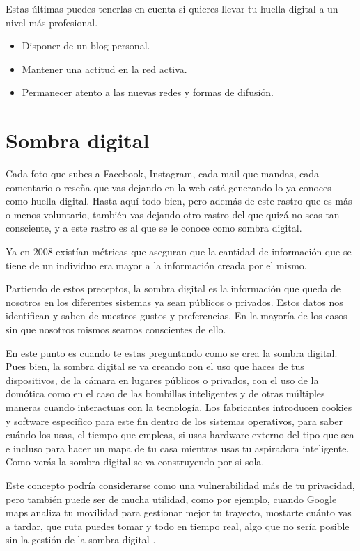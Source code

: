 \documentclass[
  spanish,
  a4paper,
  openany]{book}
\begin{document}
Estas últimas puedes tenerlas en cuenta si quieres llevar tu huella digital a un nivel más profesional.

\begin{itemize}
\item
  Disponer de un blog personal.
\item
  Mantener una actitud en la red activa.
\item
  Permanecer atento a las nuevas redes y formas de difusión.
\end{itemize}

\hypertarget{sombra-digital}{%
\section{Sombra digital}\label{sombra-digital}}

Cada foto que subes a Facebook, Instagram, cada mail que mandas, cada comentario o reseña que vas dejando en la web está generando lo ya conoces como huella digital. Hasta aquí todo bien, pero además de este rastro que es más o menos voluntario, también vas dejando otro rastro del que quizá no seas tan consciente, y a este rastro es al que se le conoce como sombra digital.

Ya en 2008 existían métricas que aseguran que la cantidad de información que se tiene de un individuo era mayor a la información creada por el mismo.

Partiendo de estos preceptos, la sombra digital es la información que queda de nosotros en los diferentes sistemas ya sean públicos o privados. Estos datos nos identifican y saben de nuestros gustos y preferencias. En la mayoría de los casos sin que nosotros mismos seamos conscientes de ello.

En este punto es cuando te estas preguntando como se crea la sombra digital. Pues bien, la sombra digital se va creando con el uso que haces de tus dispositivos, de la cámara en lugares públicos o privados, con el uso de la domótica como en el caso de las bombillas inteligentes y de otras múltiples maneras cuando interactuas con la tecnología. Los fabricantes introducen cookies y software especifico para este fin dentro de los sistemas operativos, para saber cuándo los usas, el tiempo que empleas, si usas hardware externo del tipo que sea e incluso para hacer un mapa de tu casa mientras usas tu aspiradora inteligente. Como verás la sombra digital se va construyendo por si sola.

Este concepto podría considerarse como una vulnerabilidad más de tu privacidad, pero también puede ser de mucha utilidad, como por ejemplo, cuando Google maps analiza tu movilidad para gestionar mejor tu trayecto, mostarte cuánto vas a tardar, que ruta puedes tomar y todo en tiempo real, algo que no sería posible sin la gestión de la sombra digital \citep{XATAKA-sombra-digital}.
\end{document}
